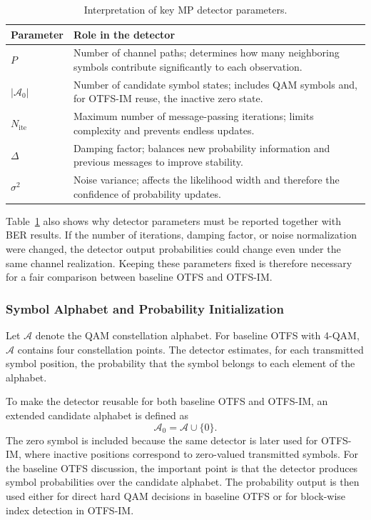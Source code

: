 \begin{table}[H]
\centering
\caption{Interpretation of key MP detector parameters.}
\label{tab:mp_detector_parameter_roles}
\begin{tabularx}{0.95\linewidth}{|p{3.0cm}|X|}
\hline
\textbf{Parameter} & \textbf{Role in the detector} \\
\hline
\(P\) & Number of channel paths; determines how many neighboring symbols contribute significantly to each observation. \\
\hline
\(|\mathcal{A}_{0}|\) & Number of candidate symbol states; includes QAM symbols and, for OTFS-IM reuse, the inactive zero state. \\
\hline
\(N_{\mathrm{ite}}\) & Maximum number of message-passing iterations; limits complexity and prevents endless updates. \\
\hline
\(\Delta\) & Damping factor; balances new probability information and previous messages to improve stability. \\
\hline
\(\sigma^2\) & Noise variance; affects the likelihood width and therefore the confidence of probability updates. \\
\hline
\end{tabularx}
\end{table}

Table~\ref{tab:mp_detector_parameter_roles} also shows why detector parameters must be reported together with BER results. If the number of iterations, damping factor, or noise normalization were changed, the detector output probabilities could change even under the same channel realization. Keeping these parameters fixed is therefore necessary for a fair comparison between baseline OTFS and OTFS-IM.

\subsubsection{Symbol Alphabet and Probability Initialization}

Let \(\mathcal{A}\) denote the QAM constellation alphabet. For baseline OTFS with 4-QAM, \(\mathcal{A}\) contains four constellation points. The detector estimates, for each transmitted symbol position, the probability that the symbol belongs to each element of the alphabet.

To make the detector reusable for both baseline OTFS and OTFS-IM, an extended candidate alphabet is defined as
\begin{equation}
    \mathcal{A}_{0}
    =
    \mathcal{A}
    \cup
    \{0\}.
\end{equation}
The zero symbol is included because the same detector is later used for OTFS-IM, where inactive positions correspond to zero-valued transmitted symbols. For the baseline OTFS discussion, the important point is that the detector produces symbol probabilities over the candidate alphabet. The probability output is then used either for direct hard QAM decisions in baseline OTFS or for block-wise index detection in OTFS-IM.

